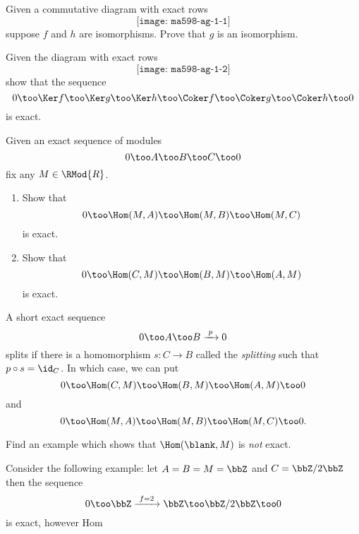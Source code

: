 \begin{problem}[\(5\)-lemma]
  Given a commutative diagram with exact rows
  \[
    \texttt{[image: ma598-ag-1-1]}
  \]
  suppose \(f\) and \(h\) are isomorphisms. Prove that \(g\) is an
  isomorphism.
\end{problem}
\begin{solution}

\end{solution}
\newpage

\begin{problem}
  Given the diagram with exact rows
  \[
    \texttt{[image: ma598-ag-1-2]}
  \]
  show that the sequence
  \[
    0\too
    \Ker f\too
    \Ker g\too
    \Ker h\too
    \Coker f\too
    \Coker g\too
    \Coker h\too
    0
  \]
  is exact.
\end{problem}
\begin{solution}
\end{solution}
\newpage

\begin{problem}
  Given an exact sequence of modules
  \[
    0\too A\too B\too C\too 0
  \]
  fix any \(M\in\RMod{R}\).
  \begin{enumerate}[label=(\alph*)]
  \item Show that
    \[
      0\too \Hom(M,A)\too\Hom(M,B)\too\Hom(M,C)
    \]
    is exact.
  \item Show that
    \[
      0\too \Hom(C,M)\too\Hom(B,M)\too\Hom(A,M)
    \]
    is exact.
  \end{enumerate}
\end{problem}
\begin{solution}
\end{solution}
\newpage

\begin{problem}
  A short exact sequence
  \[
    0\too A\too B\xrightarrow{\,\,p\,\,} 0
  \]
  splits if there is a homomorphism \(s\colon C\to B\) called the
  \emph{splitting} such that \(p\circ s=\id_C\). In which case, we can put
  \[
    0\too\Hom(C,M)\too\Hom(B,M)\too\Hom(A,M)\too 0
  \]
  and
  \[
    0\too\Hom(M,A)\too\Hom(M,B)\too\Hom(M,C)\too 0.
  \]
\end{problem}
\begin{solution}
\end{solution}
\newpage

\begin{problem}
  Find an example which shows that \(\Hom(\blank,M)\) is \emph{not} exact.
\end{problem}
\begin{solution}
  Consider the following example: let \(A=B=M=\bbZ\) and \(C=\bbZ/2\bbZ\)
  then the sequence
  \[
    0\too\bbZ\xrightarrow{\,\,f=2\,\,}\bbZ\too\bbZ/2\bbZ\too 0
  \]
  is exact, however Hom
\end{solution}


